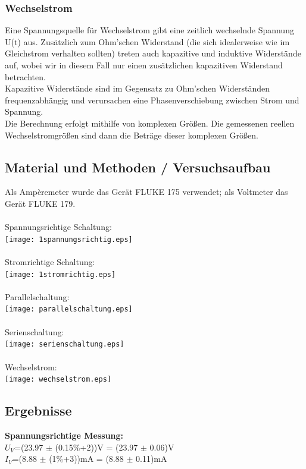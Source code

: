 \documentclass{article}
\begin{document}
\subsubsection*{Wechselstrom}
Eine Spannungsquelle für Wechselstrom gibt eine zeitlich wechselnde Spannung U(t) aus. Zusätzlich zum Ohm'schen Widerstand (die sich idealerweise wie im Gleichstrom verhalten sollten) treten auch kapazitive und induktive Widerstände auf, wobei wir in diesem Fall nur einen zusätzlichen kapazitiven Widerstand betrachten.\\
Kapazitive Widerstände sind im Gegensatz zu Ohm'schen Widerständen frequenzabhängig und verursachen eine Phasenverschiebung zwischen Strom und Spannung. \\
Die Berechnung erfolgt mithilfe von komplexen Größen. Die gemessenen reellen Wechselstromgrößen sind dann die Beträge dieser komplexen Größen.


\subsection{Material und Methoden / Versuchsaufbau}
Als Ampèremeter wurde das Gerät FLUKE 175 verwendet; als Voltmeter das Gerät FLUKE 179.\\
\\
Spannungsrichtige Schaltung:\\
\texttt{[image: 1spannungsrichtig.eps]}\\
\\
Stromrichtige Schaltung:\\
\texttt{[image: 1stromrichtig.eps]}\\
\\
Parallelschaltung:\\
\texttt{[image: parallelschaltung.eps]}\\
\\
Serienschaltung:\\
\texttt{[image: serienschaltung.eps]}\\
\\
Wechselstrom:\\
\texttt{[image: wechselstrom.eps]}\\

\subsection{Ergebnisse}
\textbf{Spannungsrichtige Messung:}\\
$U_V$=(23.97 $\pm$ (0.15\%+2))V = (23.97 $\pm$ 0.06)V\\
$I_V$=(8.88 $\pm$ (1\%+3))mA = (8.88 $\pm$ 0.11)mA\\
\end{document}

